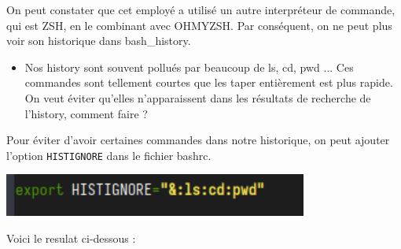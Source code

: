 \documentclass[12pt]{article}
\begin{document}
On peut constater que cet employé a utilisé un autre interpréteur de commande, qui est ZSH, en le combinant avec OHMYZSH. Par conséquent, on ne peut plus voir son historique dans bash_history.

\vspace{0.3cm}

\begin{itemize}
  \item Nos history sont souvent pollués par beaucoup de ls, cd, pwd ... Ces commandes sont tellement courtes que les taper entièrement est plus rapide. On veut éviter qu'elles n'apparaissent dans les résultats de recherche de l'history, comment faire ?
\end{itemize}

\vspace{0.3cm}

Pour éviter d'avoir certaines commandes dans notre historique, on peut ajouter l'option \texttt{HISTIGNORE} dans le fichier bashrc.

\vspace{0.3cm}

\begin{center}
  \includegraphics[width=10cm]{Images-TD-Env-Efficiency/Image-TD-4/HISTIGNORE.png}
\end{center}

\vspace{0.3cm}

\newpage

Voici le resulat ci-dessous : 

\vspace{0.3cm}
\end{document}
